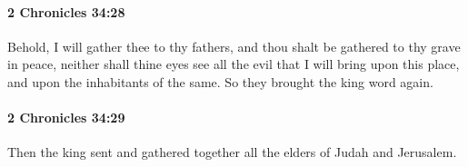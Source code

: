 		\paragraph{2 Chronicles 34:28} %
			\label{2CHRONICLES-34-28}

			Behold, I will gather thee to thy fathers, and thou shalt be gathered to thy grave in peace, neither shall thine eyes see all the evil that I will bring upon this place, and upon the inhabitants of the same. So they brought the king word again.


		\paragraph{2 Chronicles 34:29} %
			\label{2CHRONICLES-34-29}

			Then the king sent and gathered together all the elders of Judah and Jerusalem.


